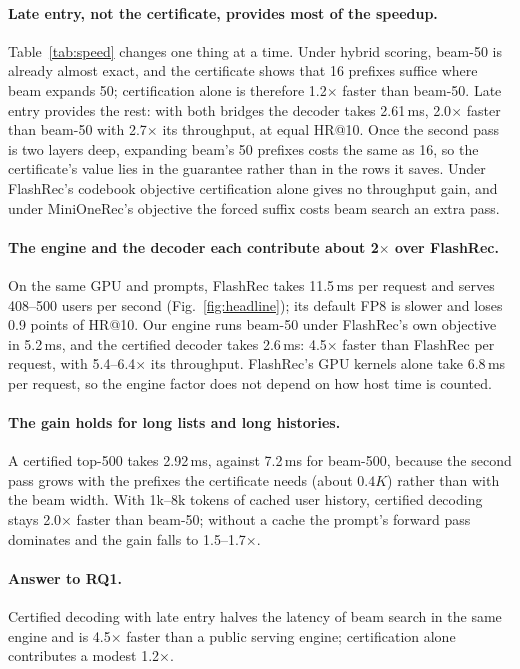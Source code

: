 \documentclass[sigconf,anonymous]{acmart}
\begin{document}
\paragraph{Late entry, not the certificate, provides most of the speedup.} Table~\ref{tab:speed} changes one thing
at a time. Under hybrid scoring, beam-50 is already almost exact, and the certificate shows that 16 prefixes suffice
where beam expands 50; certification alone is therefore 1.2$\times$ faster than beam-50. Late entry provides the
rest: with both bridges the decoder takes 2.61\,ms, 2.0$\times$ faster than beam-50 with 2.7$\times$ its
throughput, at equal HR@10. Once the second pass is two layers deep, expanding beam's 50 prefixes costs the same as
16, so the certificate's value lies in the guarantee rather than in the rows it saves. Under FlashRec's codebook
objective certification alone gives no throughput gain, and under MiniOneRec's objective the forced suffix costs
beam search an extra pass.

\paragraph{The engine and the decoder each contribute about 2$\times$ over FlashRec.} On the same GPU and prompts,
FlashRec takes 11.5\,ms per request and serves 408--500 users per second (Fig.~\ref{fig:headline}); its default
FP8 is slower and loses 0.9 points of HR@10. Our engine runs beam-50 under FlashRec's own objective in 5.2\,ms,
and the certified decoder takes 2.6\,ms: 4.5$\times$ faster than FlashRec per request, with 5.4--6.4$\times$ its
throughput. FlashRec's GPU kernels alone take 6.8\,ms per request, so the engine factor does not depend on how
host time is counted.

\paragraph{The gain holds for long lists and long histories.} A certified top-500 takes 2.92\,ms, against 7.2\,ms
for beam-500, because the second pass grows with the prefixes the certificate needs (about $0.4K$) rather than
with the beam width. With 1k--8k tokens of cached user history, certified decoding stays 2.0$\times$ faster than
beam-50; without a cache the prompt's forward pass dominates and the gain falls to 1.5--1.7$\times$.

\paragraph{Answer to RQ1.} Certified decoding with late entry halves the latency of beam search in the same engine
and is 4.5$\times$ faster than a public serving engine; certification alone contributes a modest 1.2$\times$.
\end{document}
